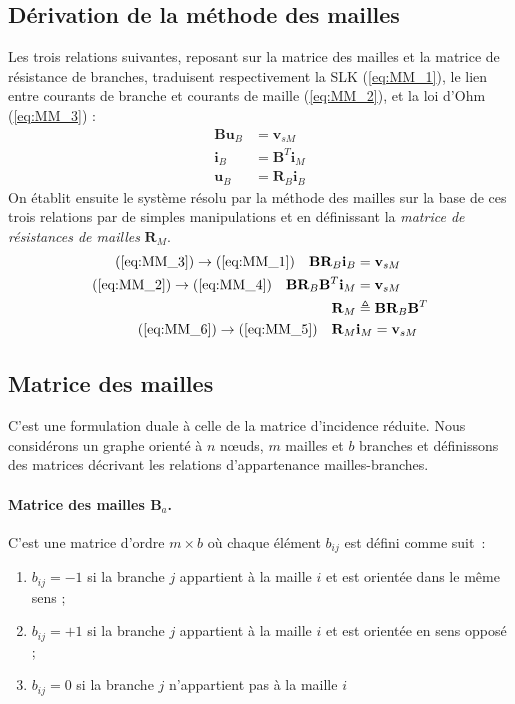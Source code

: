 \subsection{Dérivation de la méthode des mailles}

Les trois relations suivantes, reposant sur la matrice des mailles et la matrice de résistance de branches, traduisent respectivement la SLK (\ref{eq:MM_1}), le lien entre courants de branche et courants de maille (\ref{eq:MM_2}), et la loi d'Ohm (\ref{eq:MM_3}) :
\begin{align}
\mathbf{B} \mathbf{u}_B &= \mathbf{v}_{sM} \label{eq:MM_1}\\
\mathbf{i}_B &= \mathbf{B}^T \mathbf{i}_{M} \label{eq:MM_2}\\
\mathbf{u}_B &= \mathbf{R}_B \mathbf{i}_{B} \label{eq:MM_3}
\end{align}
On établit ensuite le système résolu par la méthode des mailles sur la base de ces trois relations par de simples manipulations et en définissant la \textit{matrice de résistances de mailles} $\mathbf{R}_M.$
\begin{align}
(\ref{eq:MM_3}) \rightarrow (\ref{eq:MM_1}) \quad \mathbf{B} \mathbf{R}_B \mathbf{i}_{B} &= \mathbf{v}_{sM} \label{eq:MM_4}\\
(\ref{eq:MM_2}) \rightarrow (\ref{eq:MM_4}) \quad \mathbf{B} \mathbf{R}_B \mathbf{B}^T \mathbf{i}_{M} &= \mathbf{v}_{sM} \label{eq:MM_5}\\
\mathbf{R}_M &\triangleq \mathbf{B} \mathbf{R}_B \mathbf{B}^T \label{eq:MM_6}\\
(\ref{eq:MM_6}) \rightarrow (\ref{eq:MM_5}) \quad \mathbf{R}_M &\mathbf{i}_M = \mathbf{v}_{sM}
\end{align}

\subsection{Matrice des mailles}
C'est une formulation duale à celle de la matrice d'incidence réduite.
Nous considérons un graphe orienté à $n$ nœuds, $m$ mailles et $b$ branches et définissons des matrices décrivant les relations d'appartenance mailles-branches.

\paragraph{Matrice des mailles $\mathbf{B}_a$.} C'est une matrice d'ordre $m \times b$ où chaque élément $b_{ij}$ est défini comme suit~:
\begin{enumerate}
	\item $b_{ij} = -1$ si la branche $j$ appartient à la maille $i$ et est orientée dans le même sens ;
	\item $b_{ij} = +1$ si la branche $j$ appartient à la maille $i$ et est orientée en sens opposé ;
	\item $b_{ij} = 0$ si la branche $j$ n'appartient pas à la maille $i$
\end{enumerate}

